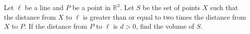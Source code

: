 Let \(\ell\) be a line and \(P\) be a point in \(\mathbb{R}^3\).
Let \(S\) be the set of points \(X\) such that the distance from \(X\) to \(\ell\) is greater than or equal to two times the distance from \(X\) to \(P\).
If the distance from \(P\) to \(\ell\) is \(d>0\), find the volume of \(S\).